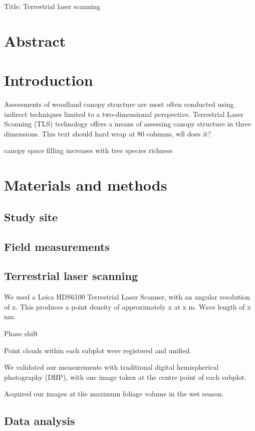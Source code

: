 \documentclass[11pt,a4paper]{article}
\newcommand{\titletext}{Terrestrial laser scanning}
\begin{document}
{\Large{Title: \titletext{}}}


\section*{Abstract}

\section{Introduction}

Assessments of woodland canopy structure are most often conducted using indirect
techniques limited to a two-dimensional perspective. Terrestrial Laser Scanning
(TLS) technology offers a means of assessing canopy structure in three
dimensions. This text should hard wrap at 80 columns, wll does it?

 canopy space filling increases with tree species richness

\section{Materials and methods}

\subsection{Study site}

\subsection{Field measurements}

\subsection{Terrestrial laser scanning}

We used a Leica HDS6100 Terrestrial Laser Scanner, with an angular resolution of
x. This produces a point density of approximately x at x m. Wave length of x nm.

Phase shift

Point clouds within each subplot were registered and unified.

We validated our measurements with traditional digital hemispherical photography
(DHP), with one image taken at the centre point of each subplot.

Acquired our images at the maximum foliage volume in the wet season.

\subsection{Data analysis}
\end{document}
